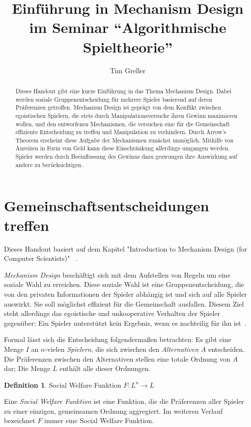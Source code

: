 \documentclass[a4paper,11pt]{article}
\title{Einführung in Mechanism Design \\ \Large im Seminar ``Algorithmische Spieltheorie''}
\author{Tim Greller}
\theoremstyle{definition}
\newtheorem{definition}{Definition}
\theoremstyle{plain}
\theoremstyle{definition}
\begin{document}
\maketitle

\begin{abstract}
	Dieses Handout gibt eine kurze Einführung in das Thema Mechanism Design.
	Dabei werden soziale Gruppenentscheidung für mehrere Spieler basierend auf deren Präferenzen getroffen. 
	Mechanism Design ist geprägt von dem Konflikt zwischen egoistischen Spielern, die stets durch Manipulationsversuche ihren Gewinn maximieren wollen, und den entworfenen Mechanismen, die versuchen eine für die Gemeinschaft effiziente Entscheidung zu treffen und Manipulation zu verhindern. Durch Arrow's Theorem erscheint diese Aufgabe der Mechanismen zunächst unmöglich. Mithilfe von Anreizen in Form von Geld kann diese Einschränkung allerdings umgangen werden. Spieler werden durch Beeinflussung des Gewinns dazu gezwungen ihre Auswirkung auf andere zu berücksichtigen.
\end{abstract}

\setcounter{page}{0}
\fancyhead{}
\fancyhead[ER]{\leftmark}
\fancyhead[OL]{\rightmark}
\fancyhead[EL,OR]{\thepage}
\pagestyle{fancy}

\section{Gemeinschaftsentscheidungen treffen}
Dieses Handout basiert auf dem Kapitel "Introduction to Mechanism Design (for Computer Scientists)" ~\cite{nis07}.

\emph{Mechanism Design} beschäftigt sich mit dem Aufstellen von Regeln um eine soziale Wahl zu erreichen. Diese soziale Wahl ist eine Gruppenentscheidung, die von den privaten Informationen der Spieler abhängig ist und sich auf alle Spieler auswirkt. Sie soll möglichst effizient für die Gemeinschaft ausfallen. Diesem Ziel steht allerdings das egoistische und unkooperative Verhalten der Spieler gegenüber: Ein Spieler unterstützt kein Ergebnis, wenn es nachteilig für ihn ist~\cite{ste08}.

Formal lässt sich die Entscheidung folgendermaßen betrachten:
Es gibt eine Menge $I$ an $n$-vielen \emph{Spielern}, die sich zwischen den \emph{Alternativen} $A$ entscheiden. Die Präferenzen zwischen den Alternativen stellen eine totale Ordnung von $A$ dar; Die Menge $L$ enthält alle dieser Ordnungen.

\begin{definition}
	\label{def:socialwelfarefunc}
	Social Welfare Funktion $F : L^n \rightarrow L$
\end{definition}
Eine \emph{Social Welfare Funktion} ist eine Funktion, die die Präferenzen aller Spieler zu einer einzigen, gemeinsamen Ordnung aggregiert. Im weiteren Verlauf bezeichnet $F$ immer eine Social Welfare Funktion.
\end{document}
